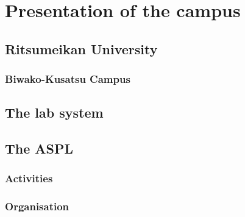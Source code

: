 \section{Presentation of the campus}
\subsection{Ritsumeikan University}
\subsubsection{Biwako-Kusatsu Campus}
\subsection{The lab system}
\subsection{The \ac{ASPL}}
\subsubsection{Activities}
\subsubsection{Organisation}
